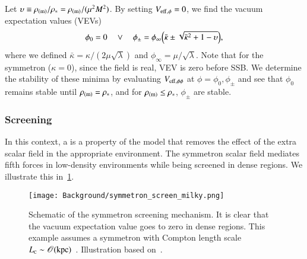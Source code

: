 


    Let $\upsilon\equiv\rho_\mathrm{(m)}/\rho_\ast = \rho_\mathrm{(m)}/(\mu^2M^2)$. By setting $V_\mathrm{eff,\phi}=0$, we find the vacuum expectation values (VEVs)
    \begin{equation}
        \phi_0 = 0 \quad \lor \quad \phi_\pm = \phi_\infty \pclosed{\bar{\kappa} \pm  \sqrt{\bar{\kappa}^2 +  1- \upsilon }},%
    \end{equation}
    where we defined $\bar{\kappa} = \kappa / (2\mu \sqrt{\lambda}) $ and $\phi_\infty = \mu/\sqrt{\lambda}$. Note that for the symmetron ($\kappa=0$), since the field is real, VEV is zero before SSB. 
    We determine the stability of these minima by evaluating $V_\mathrm{eff,\phi\phi}$ at $\phi=\phi_0,\phi_\pm$ and see that $\phi_0$ remains stable until $\rho_\mathrm{(m)}=\rho_\ast$, and for $\rho_\mathrm{(m)}\leq \rho_\ast$, $\phi_\pm$ are stable. %


    \subsubsection{Screening}
    In this context, a  is a property of the model that removes the effect of the extra scalar field in the appropriate environment. The symmetron scalar field mediates fifth forces in low-density environments while being screened in dense regions. We illustrate this in~\cref{fig:cosmo:quintessence:symmetron_screen_milky}. 

    \begin{figure}[h]
        \centering
        {\texttt{[image: Background/symmetron\_screen\_milky.png]}}
        {\caption{Schematic of the symmetron screening mechanism. It is clear that the vacuum expectation value goes to zero in dense regions. This example assumes a symmetron with Compton length scale $L_{\text{\tiny{C}}}\sim\mathscr{O}(\mathrm{kpc})$~\citep{burrageAccurateComputationScreening2024}. Illustration based on~\citet{christiansenCosmologicalSimulationsPhase2024}.}
        \label{fig:cosmo:quintessence:symmetron_screen_milky}}
    \end{figure}

